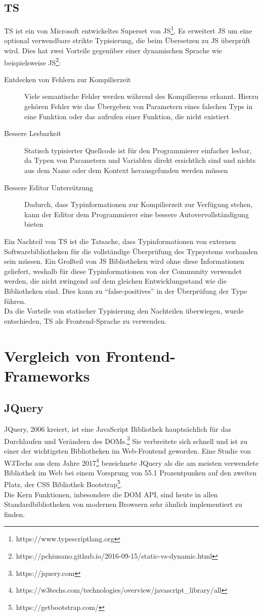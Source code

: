 \subsection{\acl{TS}}
\ac{TS} ist ein von Microsoft entwickeltes Superset von
\acl{JS}\footnote{https://www.typescriptlang.org}. Es erweitert \ac{JS} um eine
optional verwendbare strikte Typisierung, die beim Übersetzen zu \ac{JS}
überprüft wird. Dies hat zwei Vorteile gegenüber einer dynamischen Sprache wie
beispielsweise \acl{JS}\footnote{https://pchiusano.github.io/2016-09-15/static-vs-dynamic.html}:
\begin{description}
  \item[Entdecken von Fehlern zur Kompilierzeit]{Viele semantische Fehler werden
    während des Kompilierens erkannt. Hierzu gehören Fehler wie das Übergeben
    von Parametern eines falschen Typs in eine Funktion oder das aufrufen einer
    Funktion, die nicht existiert}
  \item[Bessere Lesbarkeit]{Statisch typisierter Quellcode ist für den
      Programmierer einfacher lesbar, da Typen von Parametern und Variablen
      direkt ersichtlich sind und nichts aus dem Name oder dem Kontext
      herausgefunden werden müssen}
  \item[Bessere Editor Untersützung]{Dadurch, dass Typinformationen zur
      Kompilierzeit zur Verfügung stehen, kann der Editor dem Programmierer eine
      bessere Autovervollständigung bieten}
\end{description}
Ein Nachteil von \acl{TS} ist die Tatsache, dass Typinformationen von externen
Softwarebibliotheken für die vollständige Überprüfung des Typsystems
vorhanden sein müssen. Ein Großteil von \ac{JS} Bibliotheken wird ohne diese
Informationen geliefert, weshalb für diese Typinformationen von der Community
verwendet werden, die nicht zwingend auf dem gleichen Entwicklungsstand wie die
Bibliotheken sind. Dies kann zu ``false-positives'' in der Überprüfung der Type führen.\\
Da die Vorteile von statischer Typisierung den Nachteilen überwiegen, wurde
entschieden, \acl{TS} als Frontend-Sprache zu verwenden.
\section{Vergleich von Frontend-Frameworks}
\subsection{JQuery}
JQuery, 2006 kreiert, ist eine JavaScript Bibliothek hauptsächlich für das
Durchlaufen und Verändern des \ac{DOM}s.\footnote{https://jquery.com} Sie
verbreitete sich schnell und ist zu einer der wichtigsten Bibliotheken im
Web-Frontend geworden. Eine Studie von W3Techs aus dem Jahre 2017\footnote{https://w3techs.com/technologies/overview/javascript\_library/all} bezeichnete
JQuery als die am meisten verwendete Bibliothek im Web bei einem Vorsprung von
55.1 Prozentpunken auf den zweiten Platz, der CSS Bibliothek Bootstrap\footnote{https://getbootstrap.com/}.\\
Die Kern Funktionen, inbesondere die \ac{DOM} \ac{API}, sind heute in allen Standardbibliotheken von
modernen Browsern sehr ähnlich implementiert zu finden.
